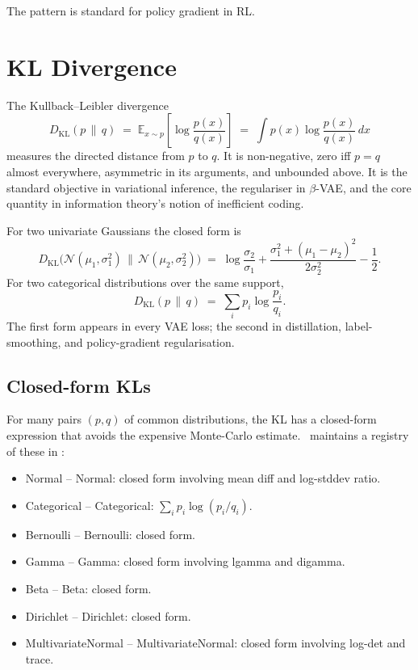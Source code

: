 The pattern is standard for policy gradient in RL.

\section{KL Divergence}
\label{sec:distributions:kl}

The Kullback--Leibler divergence
\[
D_{\mathrm{KL}}(p \,\|\, q)
\;=\; \mathbb{E}_{x \sim p}\!\left[\log \frac{p(x)}{q(x)}\right]
\;=\; \int p(x) \log \frac{p(x)}{q(x)} \, dx
\]
measures the directed distance from $p$ to $q$. It is
non-negative, zero iff $p = q$ almost everywhere, asymmetric in
its arguments, and unbounded above. It is the standard objective
in variational inference, the regulariser in $\beta$-VAE, and the
core quantity in information theory's notion of inefficient
coding.

For two univariate Gaussians the closed form is
\[
D_{\mathrm{KL}}\!\bigl(\mathcal{N}(\mu_1, \sigma_1^2) \,\|\, \mathcal{N}(\mu_2, \sigma_2^2)\bigr)
\;=\; \log \frac{\sigma_2}{\sigma_1}
   + \frac{\sigma_1^2 + (\mu_1 - \mu_2)^2}{2\sigma_2^2}
   - \frac{1}{2}.
\]
For two categorical distributions over the same support,
\[
D_{\mathrm{KL}}(p \,\|\, q) \;=\; \sum_i p_i \log \frac{p_i}{q_i}.
\]
The first form appears in every VAE loss; the second in
distillation, label-smoothing, and policy-gradient
regularisation.

\subsection{Closed-form KLs}
\label{ssec:distributions:closed_form_kl}

For many pairs $(p, q)$ of common distributions, the KL has a
closed-form expression that avoids the expensive Monte-Carlo
estimate. \Lucid\ maintains a registry of these in
:

\begin{itemize}
  \item Normal -- Normal: closed form involving mean diff and
    log-stddev ratio.
  \item Categorical -- Categorical: $\sum_i p_i \log(p_i / q_i)$.
  \item Bernoulli -- Bernoulli: closed form.
  \item Gamma -- Gamma: closed form involving lgamma and digamma.
  \item Beta -- Beta: closed form.
  \item Dirichlet -- Dirichlet: closed form.
  \item MultivariateNormal -- MultivariateNormal: closed form
    involving log-det and trace.
\end{itemize}

